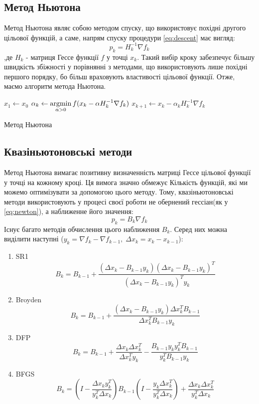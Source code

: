 \subsection*{Метод Ньютона}

Метод Ньютона являє собою методом спуску, що використовує
похідні другого цільової функцій, а саме, напрям спуску
процедури \ref{eq:descent} має вигляд:
\begin{equation}
    p_k = H^{-1}_k \nabla f_k
\end{equation} \label{eq:newton}
,де $H_k$ - матриця Гессе функції $f$ у точці $x_k$.
Такий вибір кроку забезпечує більшу швидкість збіжності у
порівнянні з методами, що використовують лише похідні першого порядку,
бо більш враховують властивості цільової функції.
Отже, маємо алгоритм метода Ньютона.

\begin{algorithm}[H] \label{alg:newton}
    \SetAlgoLined
    $x_1 \leftarrow x_0$\;
    {
        $\alpha_k \leftarrow \mathop{\mathrm{argmin}}\limits_{\alpha > 0} f(x_{k} - \alpha H^{-1}_k \nabla f_{k})$\;
        $x_{k+1} \leftarrow x_{k} - \alpha_k H^{-1}_k \nabla f_{k}$\;
    }
    \caption{Метод Ньютона}
\end{algorithm}

\subsection*{Квазіньютоновські методи}

Метод Ньютона вимагає позитивну визначенність матриці Гессе
цільової функції у точці на кожному кроці. Ця вимога значно обмежує
Кількість функцій, які ми можемо оптимізувати за допомогою
цього методу. Тому, квазіньютоновські методи використовують
у процесі своєї роботи не обернений гессіан(як у \ref{eq:newton}),
а наближенне його значення:
\begin{equation}
    p_k = B_k \nabla f_k
\end{equation}
Існує багато методів обчислення цього наближення $B_k$.
Серед них можна виділити наступні
($y_k = \nabla f_k - \nabla f_{k-1}, \;
\Delta x_k = x_k - x_{k-1} $):
\begin{enumerate}
    \item SR1
    $$ B_k = B_{k-1} + \frac{(\Delta x_{k} - B_{k-1}y_k)
    (\Delta x_{k} - B_{k-1}y_k)^{T}}
    {(\Delta x_{k} - B_{k-1}y_k)^{T}y_k} $$
    \item Broyden
    $$ B_k = B_{k-1} + \frac{(\Delta x_{k} - B_{k-1}y_k)
    \Delta x_{k}^{T}B_{k-1}}
    {\Delta x_{k}^{T}B_{k-1}y_k} $$
    \item DFP
    $$ B_k = B_{k-1} + \frac{\Delta x_{k}\Delta x_{k}^{T}}
    {\Delta x_{k}^{T}y_k} - \frac{B_{k-1}y_ky_k^{T}B_{k-1}}{y_k^{T}B_{k-1}y_k} $$
    \item BFGS
    $$ B_k = \left( I - \frac{\Delta x_{k}y_k^{T}}{y_k^{T}\Delta x_k} \right) B_{k-1}
    \left( I - \frac{y_k \Delta x_{k}^{T}}{y_k^{T}\Delta x_k} \right) +
    \frac{\Delta x_{k}\Delta x_{k}^{T}}{y_k^{T}\Delta x_k}
     $$
\end{enumerate}

